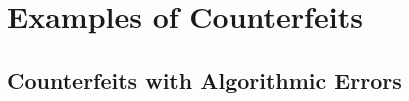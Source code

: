 \section{Examples of Counterfeits} \label{appendix:qual-sample-categories}
\subsection{Counterfeits with Algorithmic Errors}

